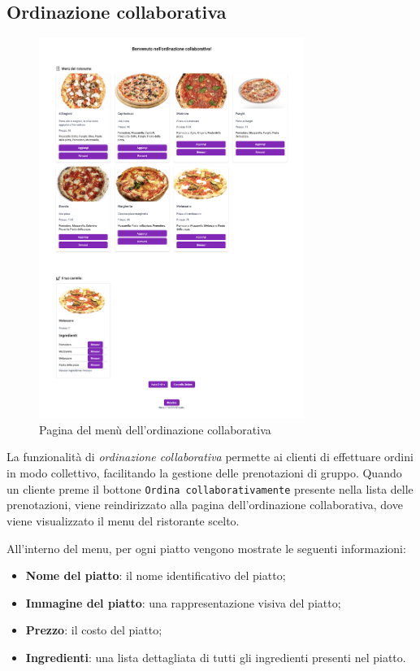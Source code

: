 \newpage
\subsection{Ordinazione collaborativa}

\begin{figure}[htbp]
	\centering
	\includegraphics[width=0.77\textwidth]{./img/menu-ordinazione-collaborativa.png}
	\caption{Pagina del menù dell'ordinazione collaborativa}
 \end{figure}
 \newpage
La funzionalità di \textit{ordinazione collaborativa} permette ai clienti di effettuare ordini in modo collettivo, facilitando la gestione delle prenotazioni di gruppo. 
Quando un cliente preme il bottone \texttt{Ordina collaborativamente} presente nella lista delle prenotazioni, viene reindirizzato alla pagina dell'ordinazione 
collaborativa, dove viene visualizzato il menu del ristorante scelto.

All'interno del menu, per ogni piatto vengono mostrate le seguenti informazioni:
\begin{itemize}
    \item \textbf{Nome del piatto}: il nome identificativo del piatto;
    \item \textbf{Immagine del piatto}: una rappresentazione visiva del piatto;
    \item \textbf{Prezzo}: il costo del piatto;
    \item \textbf{Ingredienti}: una lista dettagliata di tutti gli ingredienti presenti nel piatto.
\end{itemize}

